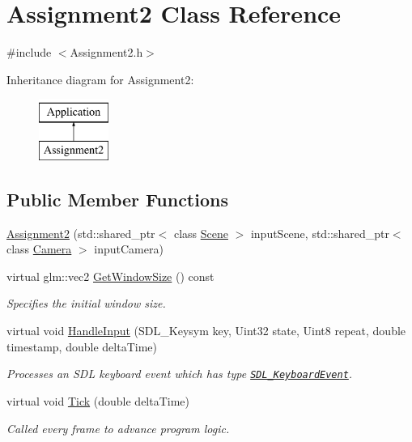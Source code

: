 \hypertarget{class_assignment2}{}\section{Assignment2 Class Reference}
\label{class_assignment2}


{\ttfamily \#include $<$Assignment2.\+h$>$}

Inheritance diagram for Assignment2\+:\begin{figure}[H]
\begin{center}
\leavevmode
\includegraphics[height=2.000000cm]{class_assignment2}
\end{center}
\end{figure}
\subsection*{Public Member Functions}
\begin{DoxyCompactItemize}
\item 
\hyperlink{class_assignment2_ac684d2ecb894a4e71f8359e3a2ebd37f}{Assignment2} (std\+::shared\+\_\+ptr$<$ class \hyperlink{class_scene}{Scene} $>$ input\+Scene, std\+::shared\+\_\+ptr$<$ class \hyperlink{class_camera}{Camera} $>$ input\+Camera)
\item 
virtual glm\+::vec2 \hyperlink{class_assignment2_a9ea79bd468c12dde5159ca7b8efd8e1e}{Get\+Window\+Size} () const
\begin{DoxyCompactList}\small\item\em Specifies the initial window size. \end{DoxyCompactList}\item 
virtual void \hyperlink{class_assignment2_a3ee099a8ba45db14103541981e3c4fe8}{Handle\+Input} (S\+D\+L\+\_\+\+Keysym key, Uint32 state, Uint8 repeat, double timestamp, double delta\+Time)
\begin{DoxyCompactList}\small\item\em Processes an S\+DL keyboard event which has type \href{https://wiki.libsdl.org/SDL_KeyboardEvent}{\tt S\+D\+L\+\_\+\+Keyboard\+Event}. \end{DoxyCompactList}\item 
virtual void \hyperlink{class_assignment2_a41544ad361dd798d5fae1ec3197fc66e}{Tick} (double delta\+Time)
\begin{DoxyCompactList}\small\item\em Called every frame to advance program logic. \end{DoxyCompactList}\end{DoxyCompactItemize}
